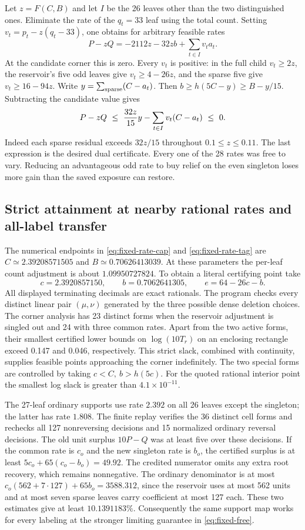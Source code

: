 \documentclass[12pt,letterpaper]{article}
\begin{document}
Let \(z=F(C,B)\) and let \(I\) be the 26 leaves other than the two distinguished ones. Eliminate the rate of the \(q_t=33\) leaf using the total count. Setting \(v_t=p_t-z(q_t-33)\), one obtains for arbitrary feasible rates
\[
 P-zQ=-2112z-32zb+\sum_{t\in I}v_t a_t.
\]
At the candidate corner this is zero. Every \(v_t\) is positive: in the full child \(v_t\ge2z\), the reservoir's five odd leaves give \(v_t\ge4-26z\), and the sparse five give \(v_t\ge16-94z\). Write \(y=\sum_{\rm sparse}(C-a_t)\). Then \(b\ge h(5C-y)\ge B-y/15\). Subtracting the candidate value gives
\[
 P-zQ\ \le\ {32z\over15}y-\sum_{t\in I}v_t(C-a_t)\ \le\ 0.
\]
Indeed each sparse residual exceeds \(32z/15\) throughout \(0.1\le z\le0.11\). The last expression is the desired dual certificate. Every one of the 28 rates was free to vary. Reducing an advantageous odd rate to buy relief on the even singleton loses more gain than the saved exposure can restore.

\subsection{Strict attainment at nearby rational rates and all-label transfer}

The numerical endpoints in \eqref{eq:fixed-rate-cap} and \eqref{eq:fixed-rate-tag}
are \(C\simeq2.39208571505\) and \(B\simeq0.70626413039\). At these parameters the per-leaf count adjustment is about \(1.09950727824\). To obtain a literal certifying point take
\[
 c=2.3920857150,\qquad b=0.7062641305,\qquad e=64-26c-b .
\]
All displayed terminating decimals are exact rationals. The program checks every distinct linear pair \((\mu,\nu)\) generated by the three possible dense deletion choices. The corner analysis has 23 distinct forms when the reservoir adjustment is singled out and 24 with three common rates. Apart from the two active forms, their smallest certified lower bounds on \(\log(10T_r)\) on an enclosing rectangle exceed 0.147 and 0.046, respectively. This strict slack, combined with continuity, supplies feasible points approaching the corner indefinitely. The two special forms are controlled by taking \(c<C,\ b>h(5c)\). For the quoted rational interior point the smallest log slack is greater than \(4.1\times10^{-11}\).

The 27-leaf ordinary supports use rate \(2.392\) on all 26 leaves except the singleton; the latter has rate \(1.808\). The finite replay verifies the 36 distinct cell forms and rechecks all 127 nonreversing decisions and 15 normalized ordinary reversal decisions. The old unit surplus \(10P-Q\) was at least five over these decisions. If the common rate is \(c_o\) and the new singleton rate is \(b_o\), the certified surplus is at least \(5c_o+65(c_o-b_o)=49.92\). The credited numerator omits any extra root recovery, which remains nonnegative. The ordinary denominator is at most \(c_o(562+7\cdot127)+65b_o=3588.312\), since the reservoir uses at most 562 units and at most seven sparse leaves carry coefficient at most 127 each. These two estimates give at least \(10.1391183\%\). Consequently the same support map works for every labeling at the stronger limiting guarantee in \eqref{eq:fixed-free}.
\end{document}
